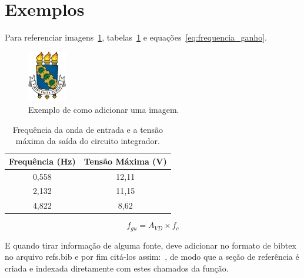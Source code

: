 \section*{Exemplos}


Para referenciar imagens~\ref{fig:brasao_UFC}, tabelas~\ref{tab:frequencia_tensao} e equações~\ref{eq:frequencia_ganho}.

\begin{figure}[!ht]
    \centering
    \includegraphics[width=0.15\textwidth]{adj/brasao.png}
    \caption{Exemplo de como adicionar uma imagem.}
    \label{fig:brasao_UFC}
\end{figure}

\begin{table}[!ht]
    \centering
    \begin{tabular}{|c|c|}
    \hline
    Frequência (Hz) & Tensão Máxima (V) \\ \hline
    0,558            & 12,11            \\ \hline
    2,132            & 11,15            \\ \hline
    4,822            & 8,62             \\ \hline
    \end{tabular}
    \caption{Frequência da onda de entrada e a tensão máxima da saída do circuito integrador.}
    \label{tab:frequencia_tensao}
\end{table}

\begin{equation}
    f_{gu} = A_{VD}\times f_{c}
    \label{eq:frequencia_ganho}
\end{equation}

E quando tirar informação de alguma fonte, deve adicionar no formato de bibtex no arquivo refs.bib e por fim citá-los assim:~\cite{Fonseca}, de modo que a seção de referência é criada e indexada diretamente com estes chamados da função.

\clearpage